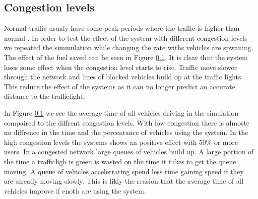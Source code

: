 \subsection{Congestion levels}

Normal traffic usualy have some peak periods where the traffic is higher than normal \cite{Vejdir}. In order to test the effect of the system with different congestion levels we repeated the simmulation while changing the rate withs vehicles are spwaning. The effect of the fuel saved can be seen in Figure \ref{}. It is clear that the system loses some effect when the congestion level starts to rise. Traffic move slower through the network and lines of blocked vehicles build op at the traffic lights. This reduce the effect of the systems as it can no longer predict an accurate distance to the trafficlight.

In Figure \ref{} we see the average time of all vehicles driving in the simulation compaired to the diffrent congestion levels. With low congestion there is almoste no diffrence in the time and the percentance of vehicles using the system. In the high congestion levels the systems shows an positive effect with 50\% or more users. In a congested network large queues of vehicles build up. A large portion of the time a trafficligh is green is wasted on the time it takes to get the queue moving. A queue of vehicles accelerrating spend less time gaining speed if they are already moving slowly. This is likly the reasion that the average time of all vehicles improve if enoth are using the system.





